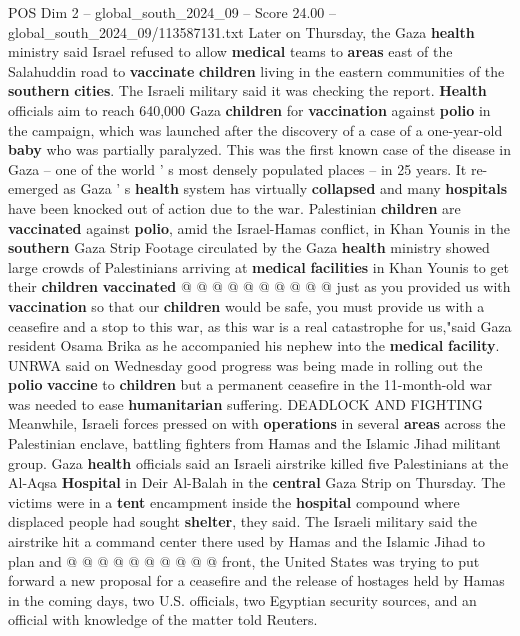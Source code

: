 \begin{textsample}{POS Dim 2 – global\_south\_2024\_09 – Score 24.00 – global\_south\_2024\_09/113587131.txt}
Later on Thursday, the Gaza \textbf{health} ministry said Israel refused to allow \textbf{medical} teams to \textbf{areas} east of the Salahuddin road to \textbf{vaccinate} \textbf{children} living in the eastern communities of the \textbf{southern} \textbf{cities}.
The Israeli military said it was checking the report. \textbf{Health} officials aim to reach 640,000 Gaza \textbf{children} for \textbf{vaccination} against \textbf{polio} in the campaign, which was launched after the discovery of a case of a one-year-old \textbf{baby} who was partially paralyzed.
This was the first known case of the disease in Gaza -- one of the world ' s most densely populated places -- in 25 years.
It re-emerged as Gaza ' s \textbf{health} system has virtually \textbf{collapsed} and many \textbf{hospitals} have been knocked out of action due to the war.
Palestinian \textbf{children} are \textbf{vaccinated} against \textbf{polio}, amid the Israel-Hamas conflict, in Khan Younis in the \textbf{southern} Gaza Strip Footage circulated by the Gaza \textbf{health} ministry showed large crowds of Palestinians arriving at \textbf{medical} \textbf{facilities} in Khan Younis to get their \textbf{children} \textbf{vaccinated} @ @ @ @ @ @ @ @ @ @ just as you provided us with \textbf{vaccination} so that our \textbf{children} would be safe, you must provide us with a ceasefire and a stop to this war, as this war is a real catastrophe for us,"said Gaza resident Osama Brika as he accompanied his nephew into the \textbf{medical} \textbf{facility}.
UNRWA said on Wednesday good progress was being made in rolling out the \textbf{polio} \textbf{vaccine} to \textbf{children} but a permanent ceasefire in the 11-month-old war was needed to ease \textbf{humanitarian} suffering.
DEADLOCK AND FIGHTING Meanwhile, Israeli forces pressed on with \textbf{operations} in several \textbf{areas} across the Palestinian enclave, battling fighters from Hamas and the Islamic Jihad militant group.
Gaza \textbf{health} officials said an Israeli airstrike killed five Palestinians at the Al-Aqsa \textbf{Hospital} in Deir Al-Balah in the \textbf{central} Gaza Strip on Thursday.
The victims were in a \textbf{tent} encampment inside the \textbf{hospital} compound where displaced people had sought \textbf{shelter}, they said.
The Israeli military said the airstrike hit a command center there used by Hamas and the Islamic Jihad to plan and @ @ @ @ @ @ @ @ @ @ front, the United States was trying to put forward a new proposal for a ceasefire and the release of hostages held by Hamas in the coming days, two U.S. officials, two Egyptian security sources, and an official with knowledge of the matter told Reuters.

\end{textsample}
